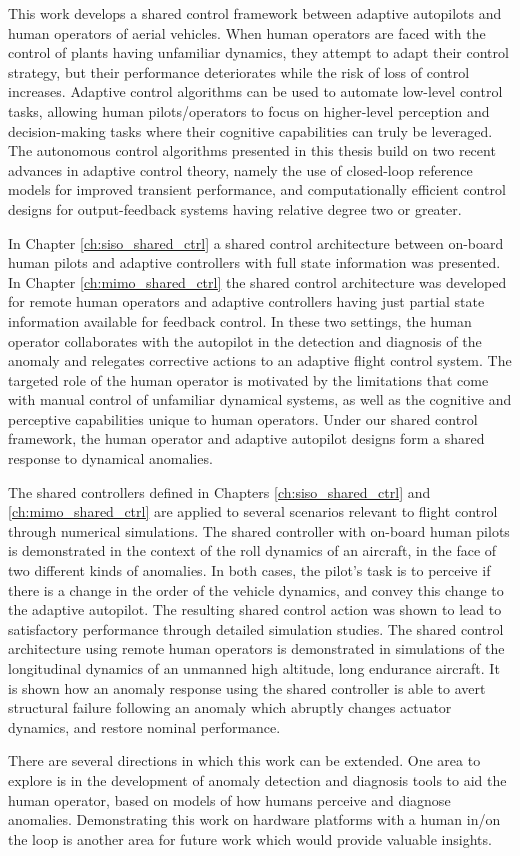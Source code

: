 This work develops a shared control framework between adaptive autopilots and human operators of aerial vehicles. When human operators are faced with the control of plants having unfamiliar dynamics, they attempt to adapt their control strategy, but their performance deteriorates while the risk of loss of control increases. Adaptive control algorithms can be used to automate low-level control tasks, allowing human pilots/operators to focus on higher-level perception and decision-making tasks where their cognitive capabilities can truly be leveraged. The autonomous control algorithms presented in this thesis build on two recent advances in adaptive control theory, namely the use of closed-loop reference models for improved transient performance, and computationally efficient control designs for output-feedback systems having relative degree two or greater. 

In Chapter \ref{ch:siso_shared_ctrl} a shared control architecture between on-board human pilots and adaptive controllers with full state information was presented. In Chapter \ref{ch:mimo_shared_ctrl} the shared control architecture was developed for remote human operators and adaptive controllers having just partial state information available for feedback control. In these two settings, the human operator collaborates with the autopilot in the detection and diagnosis of the anomaly and relegates corrective actions to an adaptive flight control system. The targeted role of the human operator is motivated by the limitations that come with manual control of unfamiliar dynamical systems, as well as the cognitive and perceptive capabilities unique to human operators. Under our shared control framework, the human operator and adaptive autopilot designs form a shared response to dynamical anomalies. 

The shared controllers defined in Chapters \ref{ch:siso_shared_ctrl} and \ref{ch:mimo_shared_ctrl} are applied to several scenarios relevant to flight control through numerical simulations. The shared controller with on-board human pilots is demonstrated in the context of the roll dynamics of an aircraft, in the face of two different kinds of anomalies. In both cases, the pilot's task is to perceive if there is a change in the order of the vehicle dynamics, and convey this change to the adaptive autopilot. The resulting shared control action was shown to lead to satisfactory performance through detailed simulation studies. The shared control architecture using remote human operators is demonstrated in simulations of the longitudinal dynamics of an unmanned high altitude, long endurance aircraft. It is shown how an anomaly response using the shared controller is able to avert structural failure following an anomaly which abruptly changes actuator dynamics, and restore nominal performance.

There are several directions in which this work can be extended. One area to explore is in the development of anomaly detection and diagnosis tools to aid the human operator, based on models of how humans perceive and diagnose anomalies. Demonstrating this work on hardware platforms with a human in/on the loop is another area for future work which would provide valuable insights. 
